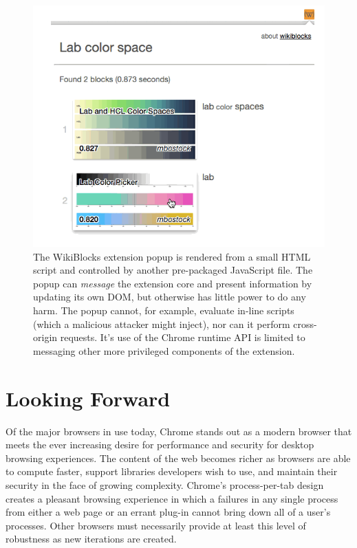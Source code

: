\documentclass[a4paper, 11pt]{article} %
\begin{document}
\begin{figure}
	\centering
	\includegraphics[width=\textwidth]{wikiblocks-lab}
	\caption{The WikiBlocks extension popup is rendered from a small HTML script and controlled by another pre-packaged JavaScript file. The popup can \textit{message} the extension core and present information by updating its own DOM, but otherwise has little power to do any harm. The popup cannot, for example, evaluate in-line scripts (which a malicious attacker might inject), nor can it perform cross-origin requests. It's use of the Chrome runtime API is limited to messaging other more privileged components of the extension.}
	\label{fig:wikiblocks-lab}
\end{figure}

\eject

\section{Looking Forward}

Of the major browsers in use today, Chrome stands out as a modern browser that meets the ever increasing desire for performance and security for desktop browsing experiences. The content of the web becomes richer as browsers are able to compute faster, support libraries developers wish to use, and maintain their security in the face of growing complexity. Chrome's process-per-tab design creates a pleasant browsing experience in which a failures in any single process from either a web page or an errant plug-in cannot bring down all of a user's processes. Other browsers must necessarily provide at least this level of robustness as new iterations are created.
\end{document}
